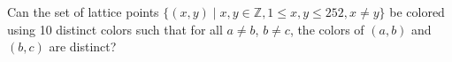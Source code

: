 Can the set of lattice points $\{(x, y) \mid x, y \in \mathbb{Z}, 1 \le x, y \le 252, x \neq y\}$ be colored using 10 distinct colors such that for all $a \neq b$,  $b \neq c$,  the colors of $(a, b)$ and $(b, c)$ are distinct?